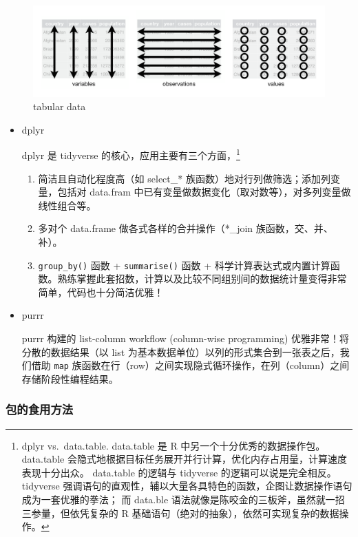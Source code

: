 \documentclass[11pt,hyperref]{ctexart}
\begin{document}
\begin{figure}
\centering
\includegraphics{images/tidy.png}
\caption{tabular data}
\end{figure}

\begin{itemize}
\item
  dplyr

  dplyr 是 tidyverse 的核心，应用主要有三个方面，\footnote{dplyr
    vs.~data.table. data.table 是 R 中另一个十分优秀的数据操作包。
    data.table
    会隐式地根据目标任务展开并行计算，优化内存占用量，计算速度表现十分出众。
    data.table 的逻辑与 tidyverse 的逻辑可以说是完全相反。 tidyverse
    强调语句的直观性，辅以大量各具特色的函数，企图让数据操作语句成为一套优雅的拳法；
    而 data.ble 语法就像是陈咬金的三板斧，虽然就一招三参量，但依凭复杂的
    R 基础语句（绝对的抽象），依然可实现复杂的数据操作。}

  \begin{enumerate}
  \def\labelenumi{\arabic{enumi}.}
  \item
    简洁且自动化程度高（如 select\_*
    族函数）地对行列做筛选；添加列变量，包括对 data.fram
    中已有变量做数据变化（取对数等），对多列变量做线性组合等。
  \item
    多对个 data.frame 做各式各样的合并操作（*\_join
    族函数，交、并、补）。
  \item
    \texttt{group\_by()} 函数 + \texttt{summarise()} 函数 +
    科学计算表达式或内置计算函数。熟练掌握此套招数，计算以及比较不同组别间的数据统计量变得非常简单，代码也十分简洁优雅！
  \end{enumerate}
\item
  purrr

  purrr 构建的 list-column workflow (column-wise programming)
  优雅非常！将分散的数据结果（以 list
  为基本数据单位）以列的形式集合到一张表之后，我们借助 \texttt{map}
  族函数在行（row）之间实现隐式循环操作，在列（column）之间存储阶段性编程结果。
\end{itemize}

\hypertarget{ux5305ux7684ux98dfux7528ux65b9ux6cd5}{%
\subsubsection{包的食用方法}\label{ux5305ux7684ux98dfux7528ux65b9ux6cd5}}
\end{document}
